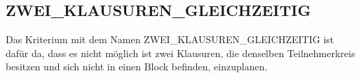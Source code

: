 \subsection{ZWEI\_KLAUSUREN\_GLEICHZEITIG}
Das Kriterium mit dem Namen ZWEI\_KLAUSUREN\_GLEICHZEITIG ist dafür da, dass es nicht
möglich ist zwei Klausuren, die denselben Teilnehmerkreis besitzen und sich nicht in einen
Block befinden, einzuplanen.